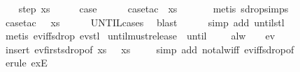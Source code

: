 \begin{isabellebody}
\isamarkupfalse%
\isanewline
\ \ \isamarkupfalse%
\ {\isacharparenleft}step\ xs{\isacharparenright}\isanewline
\ \ \isamarkupfalse%
\ \isamarkupfalse%
\ {\isacharquery}case\isanewline
\ \ \ \ \isamarkupfalse%
\ {\isacharparenleft}case{\isacharunderscore}tac\ {\isachardoublequoteopen}{\isasympsi}\ xs{\isachardoublequoteclose}{\isacharparenright}\isanewline
\ \ \ \ \ \isamarkupfalse%
\ {\isacharparenleft}metis\ sdrop{\isachardot}simps{\isacharparenleft}{}{\isacharparenright}{\isacharparenright}\isanewline
\ \ \ \ \isamarkupfalse%
\ {\isacharparenleft}case{\isacharunderscore}tac\ {\isachardoublequoteopen}{\isasymnot}\ {\isasymphi}\ xs{\isachardoublequoteclose}{\isacharparenright}\isanewline
\ \ \ \ \isamarkupfalse%
\ UNTIL{\isachardot}cases\ \isamarkupfalse%
\ blast\isanewline
\ \ \ \ \isamarkupfalse%
\ {\isacharparenleft}simp\ add{\isacharcolon}\ until{\isacharunderscore}stl{\isacharparenright}\isanewline
\ \ \ \ \isamarkupfalse%
\ {\isacharparenleft}metis\ ev{\isacharunderscore}iff{\isacharunderscore}sdrop\ ev{\isacharunderscore}stl{\isacharparenright}\isanewline
{}\isamarkupfalse%
%
\endisatagproof
{\isafoldproof}%
%
\isadelimproof
\isanewline
%
\endisadelimproof
\isanewline
{}\isamarkupfalse%
\ until{\isacharunderscore}must{\isacharunderscore}release{\isacharcolon}\ {\isachardoublequoteopen}{\isacharparenleft}{\isasymphi}\ until\ {\isasympsi}{\isacharparenright}\ {\isasymomega}\ {\isasymLongrightarrow}\ {\isasymnot}\ alw\ {\isasymphi}\ {\isasymomega}\ {\isasymLongrightarrow}\ ev\ {\isasympsi}\ {\isasymomega}{\isachardoublequoteclose}\isanewline
%
\isadelimproof
\ \ %
\endisadelimproof
%
\isatagproof
{}\isamarkupfalse%
\ {\isacharparenleft}insert\ ev{\isacharunderscore}first{\isacharunderscore}sdrop{\isacharbrackleft}of\ {\isachardoublequoteopen}{\isacharparenleft}{\isasymlambda}xs{\isachardot}\ {\isasymnot}\ {\isasymphi}\ xs{\isacharparenright}{\isachardoublequoteclose}\ {\isasymomega}{\isacharbrackright}{\isacharparenright}\isanewline
\ \ \isamarkupfalse%
\ {\isacharparenleft}simp\ add{\isacharcolon}\ not{\isacharunderscore}alw{\isacharunderscore}iff\ ev{\isacharunderscore}iff{\isacharunderscore}sdrop{\isacharbrackleft}of\ {\isasympsi}{\isacharbrackright}{\isacharparenright}\isanewline
\ \ \isamarkupfalse%
\ {\isacharparenleft}erule\ exE{\isacharparenright}\isanewline
\ \ \isamarkupfalse%

\end{isabellebody}
